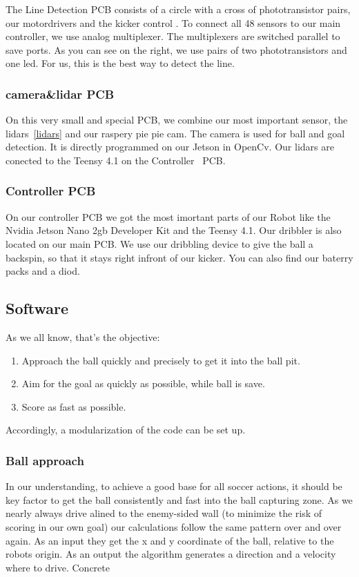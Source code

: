 \documentclass{scrartcl}
\begin{document}
The Line Detection PCB consists of a circle with a cross of phototransistor pairs, our motordrivers and the kicker control . To connect all
48 sensors to our main controller, we use analog multiplexer. The multiplexers are switched parallel
to save ports.
\newline
As you can see on the right, we use pairs of two phototransistors and one led. For us, this is the 
best way to detect the line.

\subsubsection*{camera\&lidar PCB}
On this very small and special PCB, we combine our most important sensor, the lidars~\ref{lidars} and our raspery pie 
pie cam. The camera is used for ball and goal detection. It is directly programmed on our Jetson in OpenCv.
Our lidars are conected to the Teensy 4.1 on the Controller~\label{PCB:Controller} PCB.

\subsubsection{Controller PCB}

On our controller PCB we got the most imortant parts of our Robot like the Nvidia Jetson Nano 2gb Developer Kit
and the Teensy 4.1. Our dribbler is also located on our main PCB. We use our dribbling device
to give the ball a backspin, so that it stays right infront of our kicker. You can also find our baterry packs 
and a diod. 

 \subsection{Software} %
 As we all know, that's the objective:
 \begin{enumerate}
     \item{Approach the ball quickly and precisely to get it into the ball pit.}
     \item{Aim for the goal as quickly as possible, while ball is save.}
     \item{Score as fast as possible.}
 \end{enumerate}
 Accordingly, a modularization of the code can be set up.
 \subsubsection{Ball approach}
 In our understanding, to achieve a good base for all soccer actions, it should be key factor to get the ball 
 consistently and fast into the ball capturing zone.
 As we nearly always drive alined to the enemy-sided wall (to minimize the risk of scoring in our own goal) our 
 calculations follow the same pattern over and over again. As an input they get the x and y coordinate of the 
 ball, relative to the robots origin. As an output the algorithm generates a direction and a velocity where to drive. 
 Concrete
\end{document}
